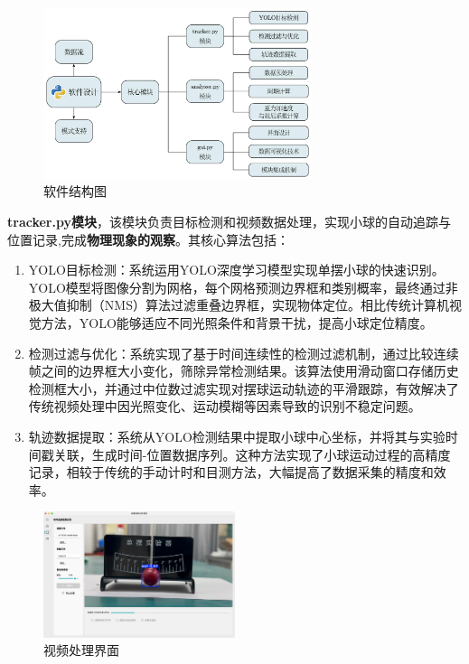 \begin{figure}[H]
    \centering
    \includegraphics[width=0.7\textwidth]{figures/软件结构图.pdf}
    \caption{软件结构图}
    \label{fig:software_structure}
\end{figure}

\textbf{tracker.py模块}，该模块负责目标检测和视频数据处理，实现小球的自动追踪与位置记录,完成\textbf{物理现象的观察}。其核心算法包括：
\begin{enumerate}
\item YOLO目标检测：系统运用YOLO深度学习模型实现单摆小球的快速识别。YOLO模型将图像分割为网格，每个网格预测边界框和类别概率，最终通过非极大值抑制（NMS）算法过滤重叠边界框，实现物体定位。相比传统计算机视觉方法，YOLO能够适应不同光照条件和背景干扰，提高小球定位精度。
    
\item 检测过滤与优化：系统实现了基于时间连续性的检测过滤机制，通过比较连续帧之间的边界框大小变化，筛除异常检测结果。该算法使用滑动窗口存储历史检测框大小，并通过中位数过滤实现对摆球运动轨迹的平滑跟踪，有效解决了传统视频处理中因光照变化、运动模糊等因素导致的识别不稳定问题。
    
\item 轨迹数据提取：系统从YOLO检测结果中提取小球中心坐标，并将其与实验时间戳关联，生成时间-位置数据序列。这种方法实现了小球运动过程的高精度记录，相较于传统的手动计时和目测方法，大幅提高了数据采集的精度和效率。

\end{enumerate}
\begin{figure}[H]
    \centering
    \includegraphics[width=0.5\textwidth]{figures/视频处理界面.png}
    \caption{视频处理界面}
    \label{fig:video_processing}
\end{figure}


